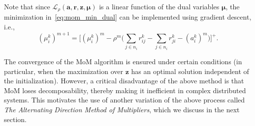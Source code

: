 \documentclass[lettersize,journal]{IEEEtran}
\begin{document}
Note that since $\mathcal{L}_{\rho} (\bm{a, r, z}, \bm{\mu})$ is a linear function of the dual variables $\bm{\mu}$, the minimization in~\eqref{eq:mom_min_dual} can be implemented using gradient descent, i.e.,
\begin{equation} \label{eq:mom_dual}
    (\mu_i^k)^{m+1} = \Bigg[(\mu_i^k)^{m} - \rho^m \bigg(\sum_{j \in n_i} r_{ij}^k - \sum_{j \in n_i} r_{ji}^k - (a_i^k)^m \bigg) \Bigg]^+. 
\end{equation}

The convergence of the MoM algorithm is ensured under certain conditions (in particular, when the maximization over $\bm{z}$ %
has an optimal solution independent of the initialization). However, a critical disadvantage of the above method is that MoM loses decomposability, thereby making it inefficient in complex distributed systems. This motivates the use of %
another variation of the above process called \textit{The Alternating Direction Method of Multipliers}, which we discuss in the next section.
\end{document}
